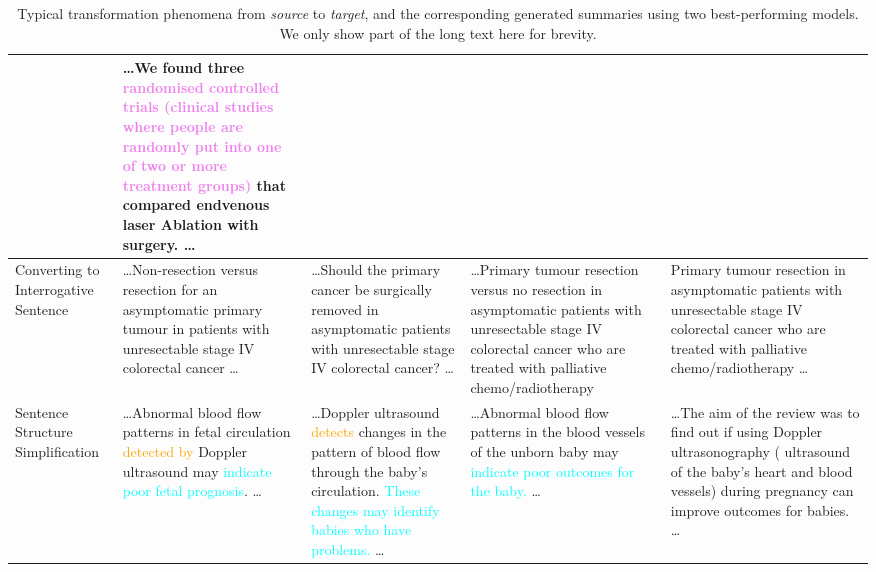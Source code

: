 \documentclass[letterpaper, table]{article} %
\begin{document}
\begin{table*}[t!]
\begin{tabular}{@{}m{1.4cm}<{\centering}m{3.55cm}<{\centering}m{3.55cm}<{\centering}m{3.55cm}<{\centering}m{3.55cm}<{\centering} @{}}
& \ldots We found three \textcolor{violet}{randomised controlled trials (clinical studies where people are randomly put into one of two or more treatment groups)} that compared endvenous laser Ablation with surgery. \ldots
 \\ \midrule
Converting to Interrogative Sentence 
& \ldots Non-resection versus resection for an asymptomatic primary tumour in patients with unresectable stage IV colorectal cancer \ldots \cite{cirocchi2012non}  
& \ldots Should the primary cancer be surgically removed in asymptomatic patients with unresectable stage IV colorectal cancer? \ldots
& \ldots Primary tumour resection versus no resection in asymptomatic patients with unresectable stage IV colorectal cancer who are treated with palliative chemo/radiotherapy 
& Primary tumour resection in asymptomatic patients with unresectable stage IV colorectal cancer who are treated with palliative chemo/radiotherapy \ldots
\\ \midrule
Sentence Structure Simplification 
& \ldots Abnormal blood flow patterns in fetal circulation \textcolor{orange}{detected by} Doppler ultrasound may \textcolor{cyan}{indicate poor fetal prognosis}. \ldots \cite{alfirevic2017fetal} 
& \ldots Doppler ultrasound \textcolor{orange}{detects} changes in the pattern of blood flow through the baby's circulation. \textcolor{cyan}{These changes may identify babies who have problems.} \ldots
& \ldots Abnormal blood flow patterns in the blood vessels of the unborn baby may \textcolor{cyan}{indicate poor outcomes for the baby.}  \ldots  
& \ldots The aim of the review was to find out if using Doppler ultrasonography ( ultrasound of the baby's heart and blood vessels) during pregnancy can improve outcomes for babies. \ldots \\ 
\bottomrule
\end{tabular}
\caption{Typical transformation phenomena from \textit{source} to \textit{target}, and the corresponding generated summaries using two best-performing models. We only show part of the long text here for brevity.}
\label{transformation_case_study}

\end{table*}
\end{document}
